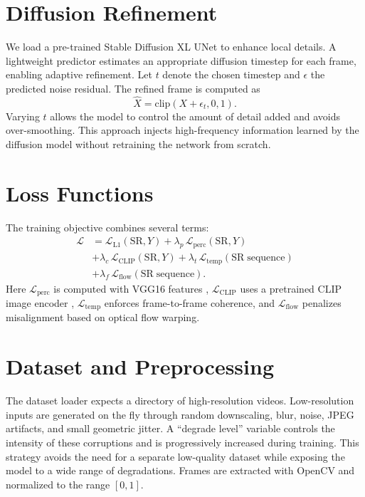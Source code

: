 \documentclass{article}
\begin{document}
\section{Diffusion Refinement}
We load a pre-trained Stable Diffusion XL UNet \cite{Rombach2022} to enhance local details. A lightweight predictor estimates an appropriate diffusion timestep for each frame, enabling adaptive refinement. Let $t$ denote the chosen timestep and $\epsilon$ the predicted noise residual. The refined frame is computed as
\begin{equation}
\hat{X} = \mathrm{clip}(X + \epsilon_t, 0, 1).
\end{equation}
Varying $t$ allows the model to control the amount of detail added and avoids over-smoothing. This approach injects high-frequency information learned by the diffusion model without retraining the network from scratch.

\section{Loss Functions}
The training objective combines several terms:
\begin{align}
\mathcal{L} &= \mathcal{L}_{\mathrm{L1}}(\mathrm{SR}, Y) + \lambda_p \, \mathcal{L}_{\mathrm{perc}}(\mathrm{SR}, Y) \\
&+ \lambda_c \, \mathcal{L}_{\mathrm{CLIP}}(\mathrm{SR}, Y) + \lambda_t \, \mathcal{L}_{\mathrm{temp}}(\mathrm{SR\;sequence}) \\
&+ \lambda_f \, \mathcal{L}_{\mathrm{flow}}(\mathrm{SR\;sequence}).
\end{align}
Here $\mathcal{L}_{\mathrm{perc}}$ is computed with VGG16 features \cite{Simonyan2014}, $\mathcal{L}_{\mathrm{CLIP}}$ uses a pretrained CLIP image encoder \cite{Radford2021}, $\mathcal{L}_{\mathrm{temp}}$ enforces frame-to-frame coherence, and $\mathcal{L}_{\mathrm{flow}}$ penalizes misalignment based on optical flow warping.

\section{Dataset and Preprocessing}
The dataset loader expects a directory of high-resolution videos. Low-resolution inputs are generated on the fly through random downscaling, blur, noise, JPEG artifacts, and small geometric jitter. A ``degrade level'' variable controls the intensity of these corruptions and is progressively increased during training. This strategy avoids the need for a separate low-quality dataset while exposing the model to a wide range of degradations. Frames are extracted with OpenCV and normalized to the range $[0,1]$.
\end{document}
